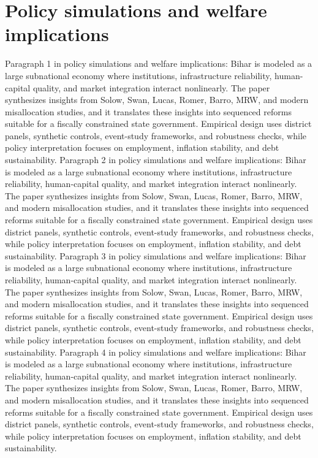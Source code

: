 \documentclass[preprint,12pt]{elsarticle}
\begin{document}
\section{Policy simulations and welfare implications}
Paragraph 1 in policy simulations and welfare implications: Bihar is modeled as a large subnational economy where institutions, infrastructure reliability, human-capital quality, and market integration interact nonlinearly. The paper synthesizes insights from Solow, Swan, Lucas, Romer, Barro, MRW, and modern misallocation studies, and it translates these insights into sequenced reforms suitable for a fiscally constrained state government. Empirical design uses district panels, synthetic controls, event-study frameworks, and robustness checks, while policy interpretation focuses on employment, inflation stability, and debt sustainability.
Paragraph 2 in policy simulations and welfare implications: Bihar is modeled as a large subnational economy where institutions, infrastructure reliability, human-capital quality, and market integration interact nonlinearly. The paper synthesizes insights from Solow, Swan, Lucas, Romer, Barro, MRW, and modern misallocation studies, and it translates these insights into sequenced reforms suitable for a fiscally constrained state government. Empirical design uses district panels, synthetic controls, event-study frameworks, and robustness checks, while policy interpretation focuses on employment, inflation stability, and debt sustainability.
Paragraph 3 in policy simulations and welfare implications: Bihar is modeled as a large subnational economy where institutions, infrastructure reliability, human-capital quality, and market integration interact nonlinearly. The paper synthesizes insights from Solow, Swan, Lucas, Romer, Barro, MRW, and modern misallocation studies, and it translates these insights into sequenced reforms suitable for a fiscally constrained state government. Empirical design uses district panels, synthetic controls, event-study frameworks, and robustness checks, while policy interpretation focuses on employment, inflation stability, and debt sustainability.
Paragraph 4 in policy simulations and welfare implications: Bihar is modeled as a large subnational economy where institutions, infrastructure reliability, human-capital quality, and market integration interact nonlinearly. The paper synthesizes insights from Solow, Swan, Lucas, Romer, Barro, MRW, and modern misallocation studies, and it translates these insights into sequenced reforms suitable for a fiscally constrained state government. Empirical design uses district panels, synthetic controls, event-study frameworks, and robustness checks, while policy interpretation focuses on employment, inflation stability, and debt sustainability.
\end{document}
